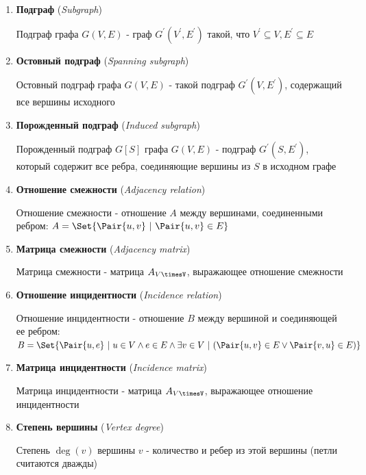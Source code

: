 \documentclass[12pt]{article}
\begin{document}
\begin{enumerate}
        \item \textbf{Подграф} (\textit{Subgraph})

        Подграф графа $G(V, E)$ - граф $G^\prime(V^\prime, E^\prime)$
        такой, что $V^\prime \subseteq V, E^\prime \subseteq E$

        \item \textbf{Остовный подграф} (\textit{Spanning subgraph})

        Остовный подграф графа $G(V, E)$ - такой подграф $G^\prime(V, E^\prime)$, содержащий все вершины исходного


        \item \textbf{Порожденный подграф} (\textit{Induced subgraph})

        Порожденный подграф $G[S]$ графа $G(V, E)$ - подграф $G^\prime(S, E^\prime)$, который содержит все ребра, соединяющие вершины из $S$ в исходном графе

        \item \textbf{Отношение смежности} (\textit{Adjacency relation})

        Отношение смежности - отношение $A$ между вершинами, соединенными ребром: $A = \Set{\Pair{u, v} \ | \ \Pair{u, v} \in E}$

        \item \textbf{Матрица смежности} (\textit{Adjacency matrix})

        Матрица смежности - матрица $A_{V\timesV}$, выражающее отношение смежности


        \item \textbf{Отношение инцидентности} (\textit{Incidence relation})

        Отношение инцидентности - отношение $B$ между вершиной и соединяющей ее ребром: $B = \Set{\Pair{u, e} \ | \ u \in V \land e \in E \land \exists v \in V \ | \ (\Pair{u, v} \in E \lor \Pair{v, u} \in E)}$

        \item \textbf{Матрица инцидентности} (\textit{Incidence matrix})

        Матрица инцидентности - матрица $A_{V\timesV}$, выражающее отношение инцидентности


        \item \textbf{Степень вершины} (\textit{Vertex degree})

        Степень $\deg(v)$ вершины $v$ - количество и ребер из этой вершины (петли считаются дважды)


\end{enumerate}
\end{document}
